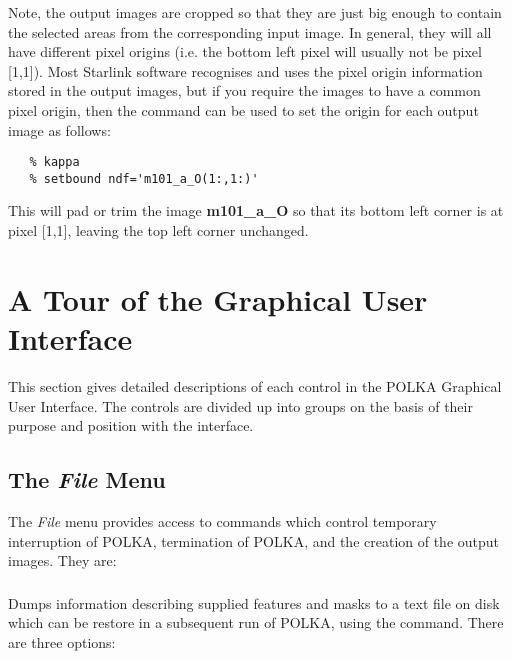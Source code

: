 Note, the output images are cropped so that they are just big enough to
contain the selected areas from the corresponding input image. In
general, they will all have different pixel origins (i.e. the bottom left
pixel will usually not be pixel [1,1]). Most Starlink software recognises
and uses the pixel origin information stored in the output images, but if
you require the images to have a common pixel origin, then the
 command 
can be used to set the origin for each output image as follows:

\begin{verbatim}
   % kappa
   % setbound ndf='m101_a_O(1:,1:)' 
\end{verbatim}

This will pad or trim the image {\bf m101\_a\_O} so that its bottom left 
corner is at pixel [1,1], leaving the top left corner unchanged.

\section {A Tour of the Graphical User Interface}
This section gives detailed descriptions of each control in the POLKA 
Graphical User Interface. The controls are divided up into groups on the
basis of their purpose and position with the interface.

\subsection {The {\em File} Menu}
The {\em File} menu provides access to commands which control
temporary interruption of POLKA,
termination of POLKA, and the creation of the output images. They are:

\subsubsection {} 
Dumps information describing supplied features and masks to a text file 
on disk which can be restore in a subsequent run of POLKA, using the 
 command. There are three
options:

